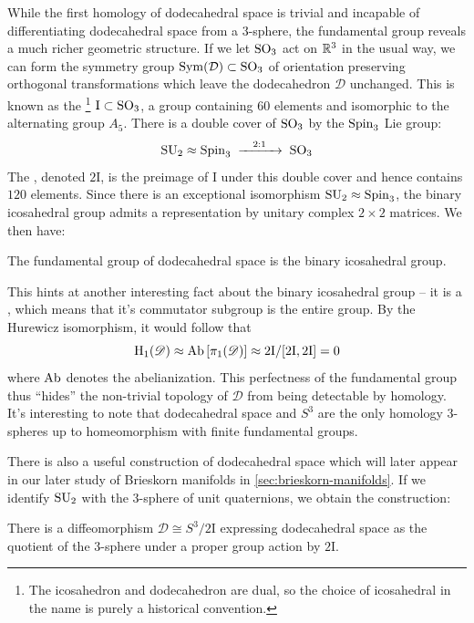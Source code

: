 While the first homology of dodecahedral space is trivial and incapable of differentiating dodecahedral space from a 3-sphere, the fundamental group reveals a much richer geometric structure. If we let ${\operatorname{SO}}_3$ act on $\mathbb{R}^3$ in the usual way, we can form the symmetry group $\operatorname{\operatorname{Sym}}(\mathcal{D})\subset {\operatorname{SO}}_3$ of orientation preserving orthogonal transformations which leave the dodecahedron $\mathcal{D}$ unchanged. This is known as the \footnote{The icosahedron and dodecahedron are dual, so the choice of icosahedral in the name is purely a historical convention.} $\mathrm{I}\subset {\operatorname{SO}}_3$, a group containing $60$ elements and isomorphic to the alternating group $A_5$. There is a double cover of ${\operatorname{SO}}_3$ by the ${\operatorname{Spin}}_3$ Lie group:
\[
	\SU_2\cong \Spin_3\lkxto[2:1] \SO_3
\]
The , denoted $2\mathrm{I}$, is the preimage of $\mathrm{I}$ under this double cover and hence contains $120$ elements. Since there is an exceptional isomorphism ${\operatorname{SU}}_2\approx {\operatorname{Spin}}_3$, the binary icosahedral group admits a representation by unitary complex $2\times 2$ matrices.
We then have:
\begin{proposition}
	The fundamental group of dodecahedral space is the binary icosahedral group.
\end{proposition}
This hints at another interesting fact about the binary icosahedral group -- it is a , which means that it's commutator subgroup is the entire group. By the Hurewicz isomorphism, it would follow that
\[
	\operatorname{H}_1(\mathscr{D}) \approx \operatorname{\operatorname{Ab}}\left[ \pi_1(\mathscr{D})\right] \approx 2\mathrm{I}/[2\mathrm{I}, 2\mathrm{I}] = 0
\]
where $\operatorname{\operatorname{Ab}}$ denotes the abelianization. This perfectness of the fundamental group thus ``hides'' the non-trivial topology of $\mathscr{D}$ from being detectable by homology. It's interesting to note that dodecahedral space and $S^3$ are the only homology $3$-spheres up to homeomorphism with finite fundamental groups.

There is also a useful construction of dodecahedral space which will later appear in our later study of Brieskorn manifolds in \cref{sec:brieskorn-manifolds}. If we identify ${\operatorname{SU}}_2$ with the $3$-sphere of unit quaternions, we obtain the construction:

\begin{proposition}
	There is a diffeomorphism $\mathscr{D} \cong S^3 / 2\mathrm{I}$ expressing dodecahedral space as the quotient of the $3$-sphere under a proper group action by $2\mathrm{I}$.
\end{proposition}


